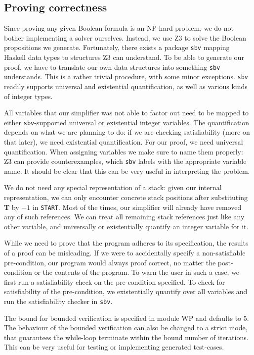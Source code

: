 \documentclass[a4paper]{article}
\begin{document}
\subsection{Proving correctness}
Since proving any given Boolean formula is an NP-hard problem, we do not bother implementing a solver ourselves. Instead, we use Z3 to solve the Boolean propositions we generate. Fortunately, there exists a package \texttt{sbv} mapping Haskell data types to structures Z3 can understand. To be able to generate our proof, we have to translate our own data structures into something \texttt{sbv} understands. This is a rather trivial procedure, with some minor exceptions. \texttt{sbv} readily supports universal and existential quantification, as well as various kinds of integer types.

All variables that our simplifier was not able to factor out need to be mapped to either \texttt{sbv}-supported universal or existential integer variables. The quantification depends on what we are planning to do: if we are checking satisfiability (more on that later), we need existential quantification. For our proof, we need universal quantification. When assigning variables we make sure to name them properly: Z3 can provide counterexamples, which \texttt{sbv} labels with the appropriate variable name. It should be clear that this can be very useful in interpreting the problem.

We do not need any special representation of a stack: given our internal representation, we can only encounter concrete stack positions after substituting \textbf{T} by $-1$ in \texttt{START}. Most of the times, our simplifier will already have removed any of such references. We can treat all remaining stack references just like any other variable, and universally or existentially quantify an integer variable for it.

While we need to prove that the program adheres to its specification, the results of a proof can be misleading. If we were to accidentally specify a non-satisfiable pre-condition, our program would always proof correct, no matter the post-condition or the contents of the program. To warn the user in such a case, we first run a satisfiability check on the pre-condition specified. To check for satisfiability of the pre-condition, we existentially quantify over all variables and run the satisfiability checker in \texttt{sbv}.

The bound for bounded verification is specified in module \textsf{WP} and defaults to 5. The behaviour of the bounded verification can also be changed to a strict mode, that guarantees the while-loop terminate within the bound number of iterations. This can be very useful for testing or implementing generated test-cases.
\end{document}
